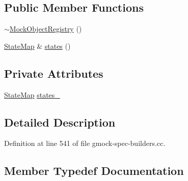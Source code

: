 \subsection*{Public Member Functions}
\begin{DoxyCompactItemize}
\item 
\hyperlink{classtesting_1_1anonymous__namespace_02gmock-spec-builders_8cc_03_1_1MockObjectRegistry_a8aca5657a32a192a6042106bfd78bf84}{$\sim$\+Mock\+Object\+Registry} ()
\item 
\hyperlink{classtesting_1_1anonymous__namespace_02gmock-spec-builders_8cc_03_1_1MockObjectRegistry_aaa830ac72cc6bc5007f65f7257d97765}{State\+Map} \& \hyperlink{classtesting_1_1anonymous__namespace_02gmock-spec-builders_8cc_03_1_1MockObjectRegistry_a9fcca86257d75633185af67a47c72e9a}{states} ()
\end{DoxyCompactItemize}
\subsection*{Private Attributes}
\begin{DoxyCompactItemize}
\item 
\hyperlink{classtesting_1_1anonymous__namespace_02gmock-spec-builders_8cc_03_1_1MockObjectRegistry_aaa830ac72cc6bc5007f65f7257d97765}{State\+Map} \hyperlink{classtesting_1_1anonymous__namespace_02gmock-spec-builders_8cc_03_1_1MockObjectRegistry_a6edd3b24e40aeef22219a0a423f40c60}{states\+\_\+}
\end{DoxyCompactItemize}


\subsection{Detailed Description}


Definition at line 541 of file gmock-\/spec-\/builders.\+cc.



\subsection{Member Typedef Documentation}
\mbox{\label{classtesting_1_1anonymous__namespace_02gmock-spec-builders_8cc_03_1_1MockObjectRegistry_aaa830ac72cc6bc5007f65f7257d97765}} 
